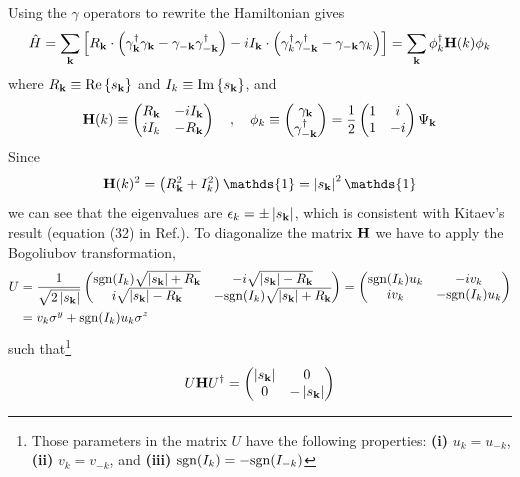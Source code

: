 Using the $\gamma$ operators to rewrite the Hamiltonian gives
\[\hat{H} = \sum_{\mathbf{k}}\left[ R_{\mathbf{k}}\cdot\left( \gamma_{\mathbf{k}}^\dagger \gamma_{\mathbf{k}} - \gamma_{-\mathbf{k}}\gamma_{-\mathbf{k}}^\dagger \right) - iI_{\mathbf{k}}\cdot\left( \gamma_{k}^\dagger \gamma_{-\mathbf{k}}^\dagger - \gamma_{-\mathbf{k}}\gamma_{k} \right) \right] = \sum_{\mathbf{k}}\phi_k^\dagger\mathbf{H}(k)\phi_k\]
where $R_{\mathbf{k}} \equiv \mathrm{Re}\left\{ s_{\mathbf{k}} \right\}$ and $I_k \equiv \mathrm{Im}\left\{ s_{\mathbf{k}} \right\}$, and 
\[\mathbf{H}(k) \equiv 
\begin{pmatrix}
    R_{\mathbf{k}} & -iI_{\mathbf{k}} \\
    iI_k & -R_{\mathbf{k}} 
\end{pmatrix} 
\quad,\quad 
\phi_k 
\equiv 
\begin{pmatrix}
    \gamma_{\mathbf{k}} \\
    \gamma_{-\mathbf{k}}^\dagger 
\end{pmatrix}
=
\frac{1}{2}
\begin{pmatrix}
    1 & i \\
    1 & -i
\end{pmatrix}
\Psi_{\mathbf{k}}
\]
Since 
\[\bo{H}(k)^2 = \lr{R_{\bo{k}}^2 + I_k^2}\mathds{1} = \abs{s_{\bo{k}}}^2\mathds{1}\]
we can see that the eigenvalues are $\epsilon_{k} = \pm\left| s_{\mathbf{k}} \right|$, which is consistent with Kitaev's result (equation (32) in Ref.\cite{Kitaev_2006}). To diagonalize the matrix $\mathbf{H}$ we have to apply the Bogoliubov transformation,
\begin{align*}
U &= \frac{1}{\sqrt{2\left| s_{\mathbf{k}} \right|}}
        \begin{pmatrix}
           \mathrm{sgn}(I_k)\sqrt{\left| s_{\mathbf{k}} \right|+R_{\mathbf{k}}} & -i\sqrt{\left| s_{\mathbf{k}} \right|-R_{\mathbf{k}}} \\
           i\sqrt{\left| s_{\mathbf{k}} \right|-R_{\mathbf{k}}} & -\mathrm{sgn}(I_k)\sqrt{\left| s_{\mathbf{k}} \right|+R_{\mathbf{k}}} 
         \end{pmatrix} 
         = 
         \begin{pmatrix}
           \mathrm{sgn}(I_k) u_k & -iv_k \\
           i v_k &  -\mathrm{sgn}(I_k) u_k
         \end{pmatrix} \\
         &= 
         v_k\sigma^y + \mathrm{sgn}(I_k)u_k\sigma^z
\end{align*}
such that\footnote{Those parameters in the matrix $U$ have the following properties: \textbf{(i)} $u_k = u_{-k}$, \textbf{(ii)} $v_{k} = v_{-k}$, and  \textbf{(iii)} $\mathrm{sgn}(I_{k}) = -\mathrm{sgn}(I_{-k})$} 
\[U\mathbf{H}U^\dagger = \begin{pmatrix}
                       \left| s_{\mathbf{k}} \right| & 0 \\
                       0 & -\left| s_{\mathbf{k}} \right| 
                     \end{pmatrix}\]
